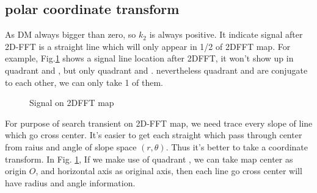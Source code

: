 \documentclass[iop]{emulateapj}
\begin{document}
\subsection{polar coordinate transform}\label{sec:polar coordinate transform}

As DM always bigger than zero, so $k_2$ is always positive. It indicate signal after 2D-FFT is a straight line which will only appear in 1/2 of 2DFFT map. For example, Fig.\ref{fig:2DFFT} shows a signal line location after 2DFFT, it won't show up in quadrant \uppercase\expandafter{} and  \uppercase\expandafter{}, but only quadrant \uppercase\expandafter{} and \uppercase\expandafter{}. nevertheless quadrant \uppercase\expandafter{} and \uppercase\expandafter{} are conjugate to each other, we can only take 1 of them.

\begin{figure}
\caption{Signal on 2DFFT map \label{fig:2DFFT}}
\end{figure}

For purpose of search transient on 2D-FFT map, we need trace every slope of line which go cross center. It's easier to get each straight which pass through center from raius and angle of slope space $(r,\theta)$. Thus it's better to take a coordinate transform.  In Fig. \ref{fig:2DFFT},  If we make use of quadrant \uppercase\expandafter{}, we can take map center as origin $O$, and horizontal axis as original axis, then each line go cross center will have radius and angle information. 

\end{document}
